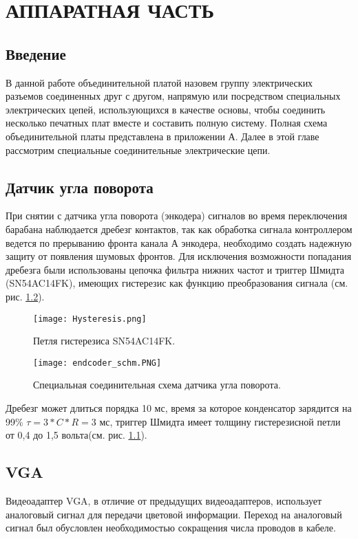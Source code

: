 \chapter{АППАРАТНАЯ ЧАСТЬ}
\section{Введение}

В данной работе объединительной платой назовем группу электрических разъемов соединенных друг с другом, напрямую или посредством специальных  электрических цепей, использующихся в качестве основы, чтобы соединить несколько печатных плат вместе и составить полную систему. Полная схема объединительной платы представлена в приложении А. Далее в этой главе рассмотрим специальные соединительные электрические цепи.

\section{Датчик угла поворота}

При снятии с датчика угла поворота (энкодера) сигналов во время переключения барабана наблюдается дребезг контактов, так как обработка сигнала контроллером ведется по прерыванию фронта канала А энкодера, необходимо создать надежную защиту от появления шумовых фронтов. Для исключения возможности попадания дребезга были использованы цепочка фильтра нижних частот и триггер Шмидта (SN54AC14FK), имеющих гистерезис как функцию преобразования сигнала (см. рис. \ref{fig:EndCSchm}).
\begin{figure}[ht]
	\centering
     \texttt{[image: Hysteresis.png]}
	\caption{Петля гистерезиса SN54AC14FK.}
	\label{fig:Hysteresis}
\end{figure}

\begin{figure}[ht]
	\centering
     \texttt{[image: endcoder\_schm.PNG]}
	\caption{Специальная соединительная схема датчика угла поворота.}
	\label{fig:EndCSchm}
\end{figure}
Дребезг может длиться порядка 10 мс, время за которое конденсатор зарядится на 99\% $ \tau=3*C*R=3 $ мс, триггер Шмидта имеет толщину гистерезисной петли от 0,4 до 1,5 вольта(см. рис. \ref{fig:Hysteresis}). 

\section{VGA}

Видеоадаптер VGA, в отличие от предыдущих видеоадаптеров, использует аналоговый сигнал для передачи цветовой информации. Переход на аналоговый сигнал был обусловлен необходимостью сокращения числа проводов в кабеле. 

